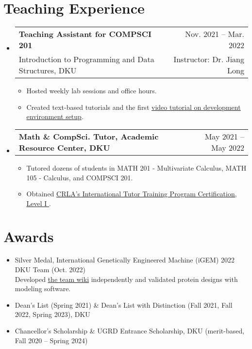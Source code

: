 \documentclass[letterpaper,11pt]{article}
\makeatletter
\newcommand{\CVItem}[1]{
  \item{\small
    {#1 \vspace{-2pt}}
  }
}
\newcommand{\CVSubheadingFrame}[1]{
  \vspace{-2pt}\item
    \begin{tabular*}{0.97\textwidth}[t]{l@{\extracolsep{\fill}}r}
        #1
    \end{tabular*}\vspace{-7pt}
}
\newcommand{\CVSubheading}[4]{\CVSubheadingFrame
    {\textbf{#1} & #2 \\
        \small#3 & #4 \\
    }}
\newcommand{\CVSubHeadingListStart}{\begin{itemize}[leftmargin=0.5cm, label={}]}
\newcommand{\CVSubHeadingListEnd}{\end{itemize}}
\newcommand{\CVItemListStart}{\begin{itemize}}
\newcommand{\CVItemListEnd}{\end{itemize}\vspace{-5pt}}
\newcommand{\uhref}[2]{\href{#1}{\underline{#2}}}
\makeatother
\begin{document}
\begin{refsection}
\nocite{luo2024fedcampus}
\printbibliography[title=Presentation]
\end{refsection}

\section{Teaching Experience}
\CVSubHeadingListStart
\CVSubheading
{Teaching Assistant for COMPSCI 201}{Nov. 2021 -- Mar. 2022}
{Introduction to Programming and Data Structures, DKU}
{Instructor: Dr. Jiang Long}
\CVItemListStart
\CVItem
{Hosted weekly lab sessions and office hours.}
\CVItem
{Created text-based tutorials and the first
    \uhref{https://www.youtube.com/watch?v=yiL-ULPBkvE}
    {video tutorial on development environment setup}.
}
\CVItemListEnd

\CVSubheadingFrame
{\textbf{Math \& CompSci. Tutor, Academic Resource Center, DKU}&
    May 2021 -- May 2022
}
\CVItemListStart
\CVItem
{Tutored dozens of students in MATH 201 - Multivariate Calculus,
    MATH 105 - Calculus,
    and COMPSCI 201.
}
\CVItem
{Obtained \uhref
    {https://github.com/SichangHe/curriculum_vitae/files/11665403/CRLA_certificate.pdf}
    {CRLA's International Tutor Training Program Certification,
        Level I
    }.}
\CVItemListEnd
\CVSubHeadingListEnd

\section{Awards}
\begin{itemize}
\item Silver Medal, International Genetically Engineered Machine (iGEM)
    2022 DKU Team (Oct. 2022)\\{\small
        Developed \uhref{https://github.com/SichangHe/igem-2022-dku-backup}
        {the team wiki} independently and
        validated protein designs with modeling software.
    }
    \vspace{-4pt}
\item Dean's List (Spring 2021) \&
    Dean's List with Distinction (Fall 2021, Fall 2022, Spring 2023),
    DKU
    \vspace{-4pt}
\item Chancellor's Scholarship \& UGRD Entrance Scholarship, DKU
    (merit-based, Fall 2020 -- Spring 2024)
    \vspace{-4pt}
\end{itemize}
\end{document}
